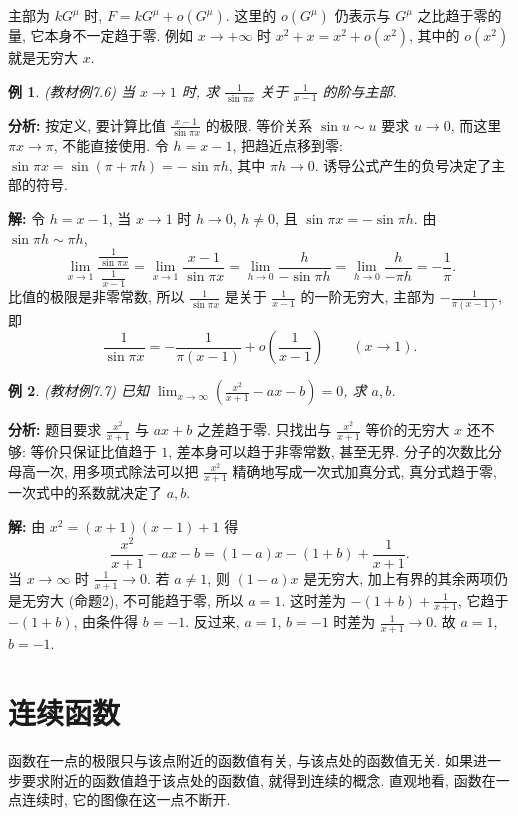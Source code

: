 \documentclass[UTF8,openany]{ctexbook}
\theoremstyle{chinesetextbook}
\newtheorem{example}{例}[section]
\newenvironment{cnsolution}{\par\indent\textbf{解:} \ignorespaces}{\par}
\begin{document}
主部为 $kG^\mu$ 时, $F=kG^\mu+o(G^\mu)$. 这里的 $o(G^\mu)$ 仍表示与 $G^\mu$ 之比趋于零的量, 它本身不一定趋于零. 例如 $x\to+\infty$ 时 $x^2+x=x^2+o(x^2)$, 其中的 $o(x^2)$ 就是无穷大 $x$.
\begin{example}\label{ex:7-6}
\textnormal{(教材例7.6)} 当 $x\to1$ 时, 求 $\displaystyle\frac1{\sin\pi x}$ 关于 $\displaystyle\frac1{x-1}$ 的阶与主部.
\end{example}
\par\indent\textbf{分析:} 按定义, 要计算比值 $\displaystyle\frac{x-1}{\sin\pi x}$ 的极限. 等价关系 $\sin u\sim u$ 要求 $u\to0$, 而这里 $\pi x\to\pi$, 不能直接使用. 令 $h=x-1$, 把趋近点移到零: $\sin\pi x=\sin(\pi+\pi h)=-\sin\pi h$, 其中 $\pi h\to0$. 诱导公式产生的负号决定了主部的符号.
\begin{cnsolution}
令 $h=x-1$, 当 $x\to1$ 时 $h\to0$, $h\ne0$, 且 $\sin\pi x=-\sin\pi h$. 由 $\sin\pi h\sim\pi h$,
\[
\lim_{x\to1}\frac{\frac1{\sin\pi x}}{\frac1{x-1}}=\lim_{x\to1}\frac{x-1}{\sin\pi x}=\lim_{h\to0}\frac h{-\sin\pi h}=\lim_{h\to0}\frac h{-\pi h}=-\frac1\pi.
\]
比值的极限是非零常数, 所以 $\displaystyle\frac1{\sin\pi x}$ 是关于 $\displaystyle\frac1{x-1}$ 的一阶无穷大, 主部为 $\displaystyle-\frac1{\pi(x-1)}$, 即
\[
\frac1{\sin\pi x}=-\frac1{\pi(x-1)}+o\!\left(\frac1{x-1}\right)\qquad(x\to1).
\]
\end{cnsolution}
\begin{example}
\textnormal{(教材例7.7)} 已知 $\displaystyle\lim_{x\to\infty}\left(\frac{x^2}{x+1}-ax-b\right)=0$, 求 $a,b$.
\end{example}
\par\indent\textbf{分析:} 题目要求 $\displaystyle\frac{x^2}{x+1}$ 与 $ax+b$ 之差趋于零. 只找出与 $\displaystyle\frac{x^2}{x+1}$ 等价的无穷大 $x$ 还不够: 等价只保证比值趋于 $1$, 差本身可以趋于非零常数, 甚至无界. 分子的次数比分母高一次, 用多项式除法可以把 $\displaystyle\frac{x^2}{x+1}$ 精确地写成一次式加真分式, 真分式趋于零, 一次式中的系数就决定了 $a,b$.
\begin{cnsolution}
由 $x^2=(x+1)(x-1)+1$ 得
\[
\frac{x^2}{x+1}-ax-b=(1-a)x-(1+b)+\frac1{x+1}.
\]
当 $x\to\infty$ 时 $\displaystyle\frac1{x+1}\to0$. 若 $a\ne1$, 则 $(1-a)x$ 是无穷大, 加上有界的其余两项仍是无穷大 (命题2), 不可能趋于零, 所以 $a=1$. 这时差为 $\displaystyle-(1+b)+\frac1{x+1}$, 它趋于 $-(1+b)$, 由条件得 $b=-1$. 反过来, $a=1$, $b=-1$ 时差为 $\displaystyle\frac1{x+1}\to0$. 故 $a=1$, $b=-1$.
\end{cnsolution}
\section{连续函数}
函数在一点的极限只与该点附近的函数值有关, 与该点处的函数值无关. 如果进一步要求附近的函数值趋于该点处的函数值, 就得到连续的概念. 直观地看, 函数在一点连续时, 它的图像在这一点不断开.
\end{document}
